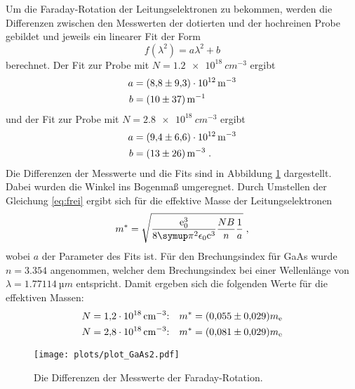 Um die Faraday-Rotation der Leitungselektronen zu bekommen, werden die Differenzen zwischen den Messwerten der dotierten und der hochreinen
Probe gebildet und jeweils ein linearer Fit der Form
\begin{equation}
  f(\lambda^2) = a\lambda^2 + b
\end{equation}
berechnet.
Der Fit zur Probe mit $N = \SI{1.2e18}{cm^{-3}}$ ergibt
\begin{align*}
  a &= \SI{8.8\pm9.3e12}{m^{-3}} \\
  b &= \SI{10\pm37}{m^{-1}}
\end{align*}
und der Fit zur Probe mit $N = \SI{2.8e18}{cm^{-3}}$ ergibt
\begin{align*}
  a &= \SI{9.4\pm6.6e12}{m^{-3}} \\
  b &= \SI{13\pm26}{m^{-3}} \;.
\end{align*}
Die Differenzen der Messwerte und die Fits sind in Abbildung \ref{fig:GaAs2} dargestellt. Dabei wurden die Winkel ins Bogenmaß umgeregnet.
Durch Umstellen der Gleichung \eqref{eq:frei} ergibt sich für die effektive Masse der Leitungselektronen
\begin{equation}
  m^* = \sqrt{\frac{\text{e}_0^3}{8\pii^2\epsilon_0\text{c}^3}\frac{NB}{n}\frac{1}{a}} \;,
\end{equation}
wobei $a$ der Parameter des Fits ist. Für den Brechungsindex für GaAs wurde $n = \num{3.354}$ angenommen, welcher dem Brechungsindex bei einer
Wellenlänge von $\lambda = \SI{1.77114}{µm}$ entspricht\cite{n_GaAs}.
Damit ergeben sich die folgenden Werte für die effektiven Massen:
\begin{align*}
  N = \SI{1.2e18}{cm^{-3}} &\text{:}\quad m^*= (\num{0.055\pm0.029})m_\text{e} \\
  N = \SI{2.8e18}{cm^{-3}} &\text{:}\quad m^*= (\num{0.081\pm0.029})m_\text{e}
\end{align*}


\begin{figure}
  \centering
  \texttt{[image: plots/plot\_GaAs2.pdf]}
  \caption{Die Differenzen der Messwerte der Faraday-Rotation.}
  \label{fig:GaAs2}
\end{figure}
\newpage
